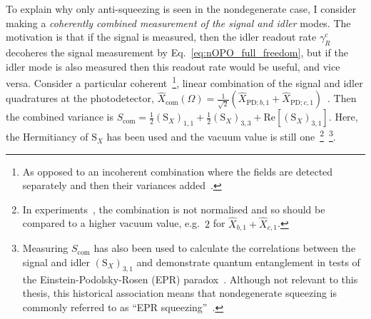To explain why only anti-squeezing is seen in the nondegenerate case, I consider making a \emph{coherently combined measurement of the signal and idler} modes. The motivation is that if the signal is measured, then the idler readout rate $\gamma^c_R$ decoheres the signal measurement by Eq.~\ref{eq:nOPO_full_freedom}, but if the idler mode is also measured then this readout rate would be useful, and vice versa. Consider a particular coherent~\footnote{As opposed to an incoherent combination where the fields are detected separately and then their variances added~\cite{}.}, linear combination of the signal and idler quadratures at the photodetector,  
$\hat X_\text{com}(\Omega)=\frac{1}{\sqrt{2}}(\hat X_{\text{PD};b,1}+\hat X_{\text{PD};c,1})$~\cite{schoriNarrowbandFrequencyTunable2002}.
Then the combined variance is %
$S_\text{com}=\frac{1}{2}(\text{S}_X)_{1,1}+\frac{1}{2}(\text{S}_X)_{3,3}+\text{Re}[(\text{S}_X)_{3,1}]$.
Here, the Hermitiancy of $\text{S}_X$ has been used and the vacuum value is still one~\footnote{In experiments~\cite{schoriNarrowbandFrequencyTunable2002}, the combination is not normalised and so should be compared to a higher vacuum value, e.g.\ $2$ for $\hat X_{b,1} + \hat X_{c,1}$.}~\footnote{Measuring $S_\text{com}$ has also been used to calculate the correlations between the signal and idler $(\text{S}_X)_{3,1}$ and demonstrate quantum entanglement in tests of the Einstein-Podolsky-Rosen (EPR) paradox~\cite{PhysRev.47.777,reidDemonstrationEinsteinPodolskyRosenParadox1989,schoriNarrowbandFrequencyTunable2002}. Although not relevant to this thesis, this historical association means that nondegenerate squeezing is commonly referred to as ``EPR squeezing''~\cite{}.}. 
